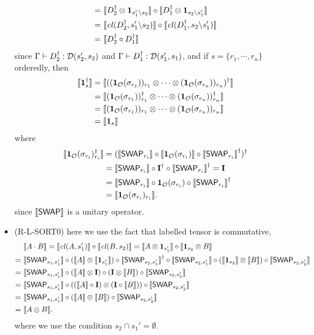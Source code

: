 \documentclass[runningheads]{llncs}
\newcommand {\Swap } {{\mathsf{SWAP}}}
\begin{document}
\begin{itemize}
\begin{align*}
    =\ & {\llbracket D_2^\dagger \otimes \mathbf{1}_{s_1'\backslash s_2} \rrbracket} \circ {\llbracket D_1^\dagger \otimes \mathbf{1}_{s_2\backslash s_1'} \rrbracket} \\ 
    =\ & {\llbracket {\mathit{cl}}(D_2^\dagger, s_1'\backslash s_2) \rrbracket} \circ {\llbracket {\mathit{cl}}(D_1^\dagger, s_2\backslash s_1') \rrbracket} \\ 
    =\ & {\llbracket D_2^\dagger \circ D_1^\dagger \rrbracket}
  \end{align*}
  since $\Gamma \vdash D_2^\dagger : {\mathcal{D}}(s_2',s_2)$ and $\Gamma \vdash D_1^\dagger : {\mathcal{D}}(s_1',s_1)$, and if $s = \{r_1,\cdots,r_n\}$ orderedly, then
  \begin{align*}
    {\llbracket \mathbf{1}_{s}^\dagger \rrbracket} & = {\llbracket ((\mathbf{1}_{\mathcal{O}}(\sigma_{r_1}))_{r_1}\otimes \cdots \otimes (\mathbf{1}_{\mathcal{O}}(\sigma_{r_n}))_{r_n})^\dagger  \rrbracket} \\
    & = {\llbracket (\mathbf{1}_{\mathcal{O}}(\sigma_{r_1}))_{r_1}^\dagger \otimes \cdots \otimes (\mathbf{1}_{\mathcal{O}}(\sigma_{r_n}))_{r_n}^\dagger  \rrbracket} \\
    & = {\llbracket (\mathbf{1}_{\mathcal{O}}(\sigma_{r_1}))_{r_1} \otimes \cdots \otimes (\mathbf{1}_{\mathcal{O}}(\sigma_{r_n}))_{r_n}  \rrbracket} \\
    &= {\llbracket \mathbf{1}_{s} \rrbracket}
  \end{align*}
  where 
  \begin{align*}
    \sem{\mathbf{1}_\OType(\sigma_{r_i})_{r_i}^\dagger} & = 
    (\sem{\Swap_{r_i}}\circ \sem{\mathbf{1}_\OType(\sigma_{r_i})} \circ \sem{\Swap_{r_i}}^\dagger)^\dagger \\
    & = \sem{\Swap_{r_i}}\circ \mathbf{I}^\dagger \circ \sem{\Swap_{r_i}}^\dagger = \mathbf{I} \\
    & = \sem{\Swap_{r_i}}\circ \mathbf{1}_\OType(\sigma_{r_i}) \circ \sem{\Swap_{r_i}}^\dagger \\
    & = \sem{\mathbf{1}_\OType(\sigma_{r_i})_{r_i}}.
  \end{align*}
  since $\sem{\Swap}$ is a unitary operator.

  \item (R-L-SORT0) here we use the fact that labelled tensor is commutative,
  \begin{align*}
    & \sem{A\cdot B} = \sem{\cl(A, s'_1)} \circ \sem{\cl(B, s_2)} = \sem{A\otimes \mathbf{1}_{s'_1}}\circ  \sem{\mathbf{1}_{s_2}\otimes B} \\
    =\ & \sem{\Swap_{s_1,s'_1}}\circ (\sem{A}\otimes \sem{\mathbf{1}_{s'_1}})\circ \sem{\Swap_{s_2,s'_1}}^\dagger \circ \sem{\Swap_{s_2,s'_1}} \circ (\sem{\mathbf{1}_{s_2}}\otimes \sem{B}) \circ \sem{\Swap_{s_2,s'_2}} \\
    =\ & \sem{\Swap_{s_1,s'_1}}\circ (\sem{A}\otimes \mathbf{I})\circ (\mathbf{I}\otimes \sem{B}) \circ \sem{\Swap_{s_2,s'_2}} \\
    =\ & \sem{\Swap_{s_1,s'_1}}\circ ((\sem{A}\circ \mathbf{I})\otimes (\mathbf{I}\circ \sem{B})) \circ \sem{\Swap_{s_2,s'_2}} \\
    =\ & \sem{\Swap_{s_1,s'_1}}\circ (\sem{A}\otimes \sem{B}) \circ \sem{\Swap_{s_2,s'_2}} \\
    =\ & \sem{A\otimes B}.
  \end{align*}
  where we use the condition $s_2\cap s_1' = \emptyset$.


\end{itemize}
\end{document}
